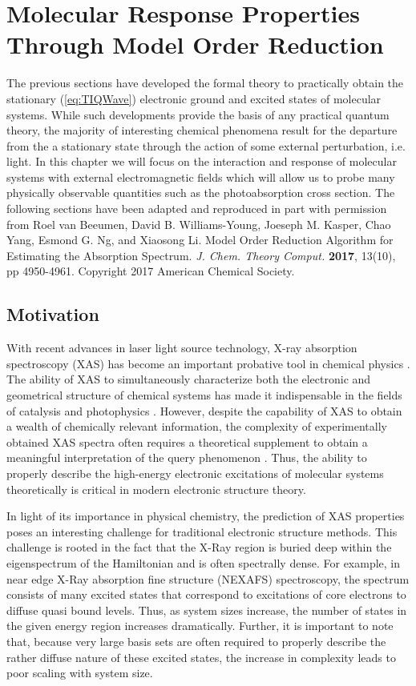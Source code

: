\chapter{Molecular Response Properties Through Model Order Reduction}
\label{ch:MOR}


The previous sections have developed the formal theory to practically obtain the stationary 
(\cref{eq:TIQWave}) electronic ground and excited states of molecular systems.
While such developments provide the basis of any practical quantum theory, the majority of interesting chemical
phenomena result for the departure from the a stationary state through the action of some external perturbation,
i.e. light. In this chapter we will focus on the interaction and response of molecular systems with external 
electromagnetic fields which will allow us to probe many physically observable quantities such as
the photoabsorption cross section. The following sections have been adapted and reproduced in part with
permission from Roel van Beeumen, David B. Williams-Young, Joeseph M. Kasper, Chao Yang, Esmond G. Ng,
and Xiaosong Li. Model Order Reduction Algorithm for Estimating the Absorption Spectrum. 
\emph{J. Chem. Theory Comput.} \textbf{2017}, 13(10), pp 4950-4961. Copyright 2017 American Chemical
Society.


\section{Motivation}

With recent advances in  laser light source technology, X-ray
absorption spectroscopy (XAS) has become an important probative tool in
chemical physics \cite{Stohr13_book}. The ability of XAS to simultaneously
characterize both the electronic and geometrical structure of chemical systems
has made it indispensable in the fields of catalysis and
photophysics \cite{Koch87_519,Chasse12_4870,Solomon95_2259,Hodgson00_5775,Hessler01_262}.
However, despite the capability of XAS to obtain a wealth of chemically
relevant information, the complexity of experimentally obtained XAS spectra
often requires a theoretical supplement to obtain a meaningful interpretation
of the query phenomenon \cite{Li16_639,Li16_8752}. Thus, the ability to properly
describe the high-energy electronic excitations of molecular systems
theoretically is critical in modern electronic structure theory.

In light of its importance in physical chemistry, the prediction of XAS properties poses an interesting challenge for traditional electronic structure methods. 
This challenge is rooted in the fact that the X-Ray region is buried deep within the eigenspectrum of the Hamiltonian and is often spectrally dense. 
For example, in near edge X-Ray absorption fine structure (NEXAFS) spectroscopy, the spectrum consists of many excited states that correspond to excitations of core electrons to diffuse quasi bound levels. 
Thus, as system sizes increase, the number of states in the given energy region increases dramatically. 
Further, it is important to note that, because very large basis sets are often required to properly describe the rather diffuse nature of these excited states, the increase in complexity leads to poor scaling with system size.


